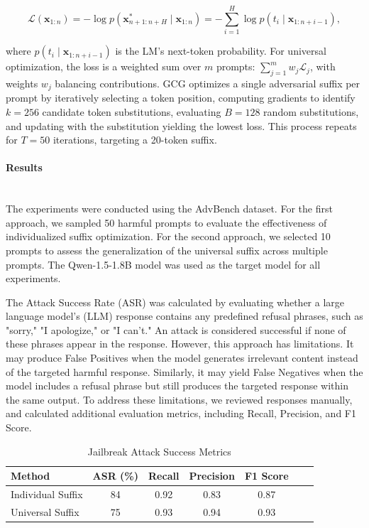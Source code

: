 \documentclass[../main.tex]{subfiles}
\begin{document}
\[
\mathcal{L}(\mathbf{x}_{1:n}) = -\log p(\mathbf{x}_{n+1:n+H}^* \mid \mathbf{x}_{1:n}) = -\sum_{i=1}^H \log p(t_i \mid \mathbf{x}_{1:n+i-1}),
\]

where \( p(t_i \mid \mathbf{x}_{1:n+i-1}) \) is the LM's next-token probability. For universal optimization, the loss is a weighted sum over \( m \) prompts: \(\sum_{j=1}^m w_j \mathcal{L}_j\), with weights \( w_j \) balancing contributions. GCG optimizes a single adversarial suffix per prompt by iteratively selecting a token position, computing gradients to identify \( k = 256 \) candidate token substitutions, evaluating \( B = 128 \) random substitutions, and updating with the substitution yielding the lowest loss. This process repeats for \( T = 50 \) iterations, targeting a 20-token suffix. 

\paragraph{Results}\leavevmode\\
The experiments were conducted using the AdvBench dataset. For the first approach, we sampled 50 harmful prompts to evaluate the effectiveness of individualized suffix optimization. For the second approach, we selected 10 prompts to assess the generalization of the universal suffix across multiple prompts. The Qwen-1.5-1.8B model was used as the target model for all experiments.

The Attack Success Rate (ASR) was calculated by evaluating whether a large language model’s (LLM) response contains any predefined refusal phrases, such as "sorry," "I apologize," or "I can’t." An attack is considered successful if none of these phrases appear in the response. However, this approach has limitations. It may produce False Positives when the model generates irrelevant content instead of the targeted harmful response. Similarly, it may yield False Negatives when the model includes a refusal phrase but still produces the targeted response within the same output. To address these limitations, we reviewed responses manually, and calculated additional evaluation metrics, including Recall, Precision, and F1 Score.
\begin{table}[H]
\centering
\caption{Jailbreak Attack Success Metrics}
\label{tab:GCG Attack success metrics}
\begin{tabular}{lcccccc}
\toprule
\textbf{Method} & \textbf{ASR (\%)} & \textbf{Recall} & \textbf{Precision} & \textbf{F1 Score}\\
\midrule
Individual Suffix   & 84 & 0.92  & 0.83  & 0.87  \\
Universal Suffix  & 75 & 0.93  & 0.94  & 0.93  \\
\bottomrule
\end{tabular}
\end{table}
\end{document}
